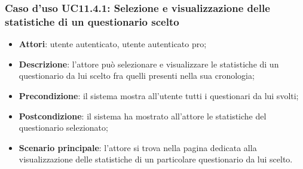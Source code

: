 \subsubsection{Caso d'uso UC11.4.1: Selezione e visualizzazione delle statistiche di un questionario scelto}
\begin{itemize}
\item\textbf{Attori}: utente autenticato, utente autenticato pro;
\item\textbf{Descrizione}: l'attore può selezionare e visualizzare le statistiche di un questionario da lui scelto fra quelli presenti nella sua cronologia;
\item\textbf{Precondizione}: il sistema mostra all'utente tutti i questionari da lui svolti;
\item\textbf{Postcondizione}: il sistema ha mostrato all'attore le statistiche del questionario selezionato;
\item\textbf{Scenario principale}: l'attore si trova nella pagina dedicata alla visualizzazione delle statistiche di un particolare questionario da lui scelto.
\end{itemize}

